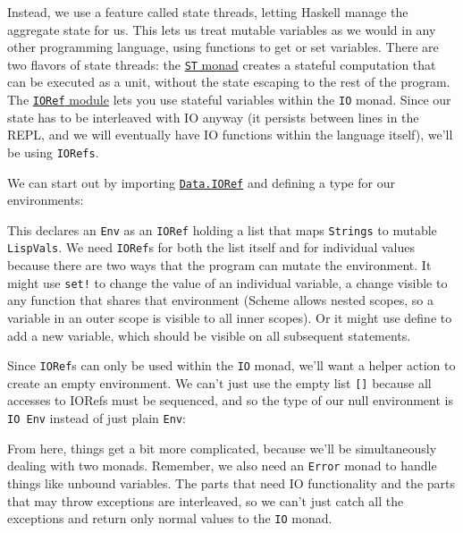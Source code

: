 Instead, we use a feature called state threads, letting Haskell manage the aggregate state for us. This lets us treat mutable variables as we would in any other programming language, using functions to get or set variables. There are two flavors of state threads: the \href{http://www.haskell.org/ghc/docs/latest/html/libraries/base/Control-Monad-ST.html}{\texttt{ST} monad} creates a stateful computation that can be executed as a unit, without the state escaping to the rest of the program. The \href{http://www.haskell.org/ghc/docs/latest/html/libraries/base/Data-IORef.html}{\texttt{IORef} module} lets you use stateful variables within the \verb|IO| monad. Since our state has to be interleaved with IO anyway (it persists between lines in the REPL, and we will eventually have IO functions within the language itself), we'll be using \verb|IORefs|.
 
We can start out by importing \href{http://www.haskell.org/ghc/docs/6.4/html/libraries/base/Data.IORef.html}{\texttt{Data.IORef}} and defining a type for our environments:
 
 
 
This declares an \verb|Env| as an \verb|IORef| holding a list that maps \verb|Strings| to mutable \verb|LispVals|. We need \verb|IORef|s for both the list itself and for individual values because there are two ways that the program can mutate the environment. It might use \verb|set!| to change the value of an individual variable, a change visible to any function that shares that environment (Scheme allows nested scopes, so a variable in an outer scope is visible to all inner scopes). Or it might use define to add a new variable, which should be visible on all subsequent statements.
 
Since \verb|IORef|s can only be used within the \verb|IO| monad, we'll want a helper action to create an empty environment. We can't just use the empty list \lstinline|[]| because all accesses to IORefs must be sequenced, and so the type of our null environment is \verb|IO Env| instead of just plain \verb|Env|:
 
 
From here, things get a bit more complicated, because we'll be simultaneously dealing with two monads. Remember, we also need an \verb|Error| monad to handle things like unbound variables. The parts that need IO functionality and the parts that may throw exceptions are interleaved, so we can't just catch all the exceptions and return only normal values to the \verb|IO| monad.
 

